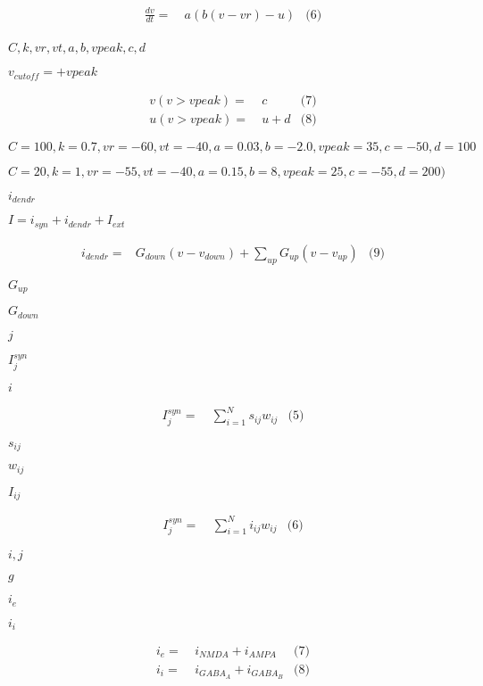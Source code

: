 \documentclass{article}
\begin{document}
\begin{align*} \frac{dv}{dt} = & ~ a (b (v - vr) - u) & \text{(6)}\\ \end{align*}
\pagebreak

$C, k, vr, vt, a, b, vpeak, c, d$
\pagebreak

$v_{cutoff}=+vpeak$
\pagebreak

\begin{align*} v(v>vpeak) = & ~ c & \text{(7)}\\ u(v>vpeak) = & ~ u + d & \text{(8)}\end{align*}
\pagebreak

$C=100, k=0.7, vr=-60, vt=-40, a=0.03, b=-2.0, vpeak=35, c=-50, d=100$
\pagebreak

$C=20, k=1, vr=-55, vt=-40, a=0.15, b=8, vpeak=25, c=-55, d=200)$
\pagebreak

$i_{dendr}$
\pagebreak

$I = i_{syn} + i_{dendr} + I_{ext}$
\pagebreak

\begin{align*} i_{dendr} = & G_{down} (v - v_{down}) + \sum \limits_{up} G_{up} (v - v_{up}) & \text{(9)} \end{align*}
\pagebreak

$G_{up}$
\pagebreak

$G_{down}$
\pagebreak

$j$
\pagebreak

$ I_{j}^{syn} $
\pagebreak

$i$
\pagebreak

\begin{align*} I_{j}^{syn} = & ~ \sum \limits_{i=1}^{N} s_{ij}w_{ij} & \text{(5)} \end{align*}
\pagebreak

$s_{ij}$
\pagebreak

$w_{ij}$
\pagebreak

$I_{ij}$
\pagebreak

\begin{align*} I_{j}^{syn} = & ~ \sum \limits_{i=1}^{N} i_{ij}w_{ij} & \text{(6)} \end{align*}
\pagebreak

$i,j$
\pagebreak

$g$
\pagebreak

$i_{e}$
\pagebreak

$i_{i}$
\pagebreak

\begin{align*} i_{e} = & ~ i_{NMDA} + i_{AMPA} & \text{(7)} \\ i_{i} = & ~ i_{GABA_{A}} + i_{GABA_{B}} & \text{(8)} \end{align*}
\pagebreak
\end{document}
